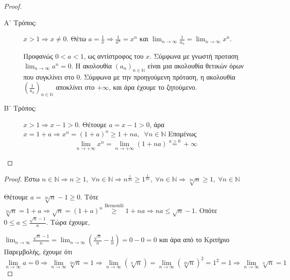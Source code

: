 \documentclass[main.tex]{subfiles}
\begin{document}

\begin{proof}
\item {}
  \begin{description}
    \item [Α᾽ Τρόπος:]
      $ x >1 \Rightarrow x \neq 0 $. Θέτω  $a = \frac{1}{x} \Rightarrow 
      \frac{1}{a^{n}} = x^{n} $ και $ \lim_{n \to \infty} \frac{1}{a_{n}} = 
      \lim_{n \to \infty}x^{n}$. 


      Προφανώς $ 0 < a <1 $, ως αντίστροφος του $x$. Σύμφωνα με γνωστή προταση
      $ \lim_{n \to \infty} a^{n} = 0 $. Η ακολουθία $ (a_{n})_{n \in \mathbb{N}}
      $ είναι μια ακολουθία θετικών όρων που συγκλίνει στο 0. Σύμφωνα με 
      την προηγούμενη πρόταση, η ακολουθία $ \left(\frac{1}{a_{n}}\right)_{n 
      \in \mathbb{N}} $ αποκλίνει στο $ + \infty $, και άρα έχουμε το ζητούμενο.
    \item [Β᾽ Τρόπος:]
      $ x>1 \Rightarrow x-1>0 $. Θέτουμε $ a = x-1>0 $, άρα $ x = 1+a 
      \Rightarrow x^{n} = (1+a)^{n} \geq 1+na, \; \; \forall n \in \mathbb{N} $ 
      Επομένως 
      \[
        \lim_{n \to +\infty} x^{n} = \lim_{n \to +\infty} (1+na) 
        \overset{a>0}{=} +\infty 
      \]
  \end{description}
\end{proof}



\begin{proof}
  Έστω $ n \in \mathbb{N} \Rightarrow n \geq 1, \; \forall n \in 
  \mathbb{N} \Rightarrow n ^{\frac{1}{2n}} \geq 1^{\frac{1}{2n}}, \; 
  \forall n \in \mathbb{N} \Rightarrow \sqrt[2n]{n} \geq 1, \; \forall n 
  \in \mathbb{N} $

  Θέτουμε $ a = \sqrt[2n]{n} -1 \geq 0 $. Τότε $ \sqrt[2n]{n} = 1 + a 
  \Rightarrow \sqrt{n} = (1+a)^{n} \overset{\text{Bernoulli}}{\geq} 1 
  + na \Rightarrow na \leq \sqrt{n} - 1  $. Οπότε $ 0 \leq a \leq
  \frac{\sqrt{n} -1}{n} $. Τώρα έχουμε, 

  $ \lim_{n \to \infty} \frac{\sqrt{n} -1}{n} = \lim_{n \to \infty} 
  \left( \frac{\sqrt{n}}{n} - \frac{1}{n}\right) = 0 - 0 = 0 $ και 
  άρα από το Κριτήριο Παρεμβολής, έχουμε ότι \[ \lim_{n \to \infty} a = 0 
    \Rightarrow \lim_{n \to \infty} \sqrt[2n]{n} = 1 \Rightarrow \lim_{n \to
    \infty} (\sqrt[n]{n}) = \lim_{n \to \infty} (\sqrt[2n]{n})^{2} =  
  1^{2} = 1 \Rightarrow \lim_{n \to \infty} \sqrt[n]{n} =1 \]
\end{proof}
\end{document}

